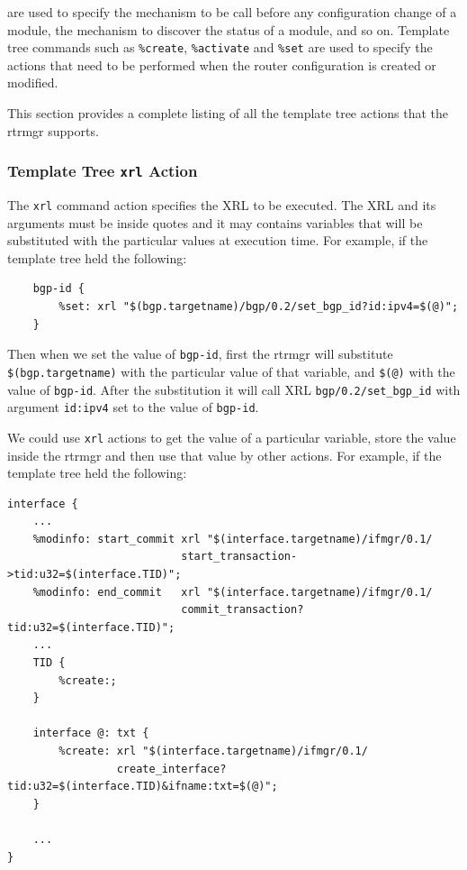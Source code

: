 \documentclass[11pt]{article}
\begin{document}
are used to specify the mechanism to be call before any configuration
change of a module, the mechanism to discover the status of a module, and so
on.
Template tree commands such as {\tt \%create}, {\tt \%activate} and
{\tt \%set} are used to specify the actions that need to be performed
when the router configuration is created or modified.

This section provides a complete listing of all the template tree
actions that the rtrmgr supports.

\subsubsection{Template Tree {\tt xrl} Action}

The {\tt xrl} command action specifies the XRL to be executed. The XRL
and its arguments must be inside quotes and it may contains variables
that will be substituted with the particular values at execution time.
For example, if the template tree held the following:

\begin{verbatim}
    bgp-id {
        %set: xrl "$(bgp.targetname)/bgp/0.2/set_bgp_id?id:ipv4=$(@)";
    }
\end{verbatim}

Then when we set the value of {\tt bgp-id}, first the rtrmgr will substitute
{\tt \$(bgp.targetname)} with the particular value of that variable, and
{\tt \$(@)} with the value of {\tt bgp-id}. After the substitution it will
call XRL {\tt bgp/0.2/set\_bgp\_id} with argument {\tt id:ipv4} set to the
value of {\tt bgp-id}.

We could use {\tt xrl} actions to get the value of a particular variable,
store the value inside the rtrmgr and then use that value by other actions.
For example, if the template tree held the following:

\begin{verbatim}
interface {
    ...
    %modinfo: start_commit xrl "$(interface.targetname)/ifmgr/0.1/
                           start_transaction->tid:u32=$(interface.TID)";
    %modinfo: end_commit   xrl "$(interface.targetname)/ifmgr/0.1/
                           commit_transaction?tid:u32=$(interface.TID)";
    ...
    TID {
        %create:;
    }

    interface @: txt {
        %create: xrl "$(interface.targetname)/ifmgr/0.1/
                 create_interface?tid:u32=$(interface.TID)&ifname:txt=$(@)";
    }

    ...
}
\end{verbatim}
\end{document}
